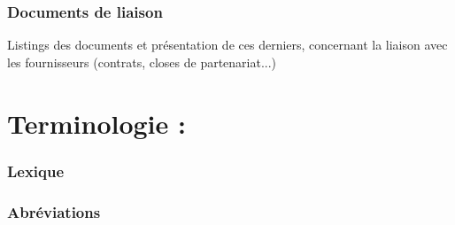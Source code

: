 \documentclass[a4paper, 18pt]{article}
\begin{document}
\section{Documents de liaison}

Listings des documents et présentation de ces derniers, concernant la liaison avec les fournisseurs (contrats, closes de partenariat...)

\part{Terminologie :}

\section{Lexique}

\section{Abréviations} 
\end{document}
